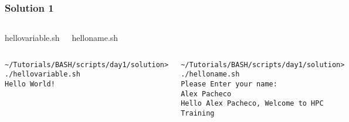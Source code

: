 \documentclass[10pt,t]{beamer}
\begin{document}
\begin{frame}[fragile]
  \frametitle{Solution 1}
  \begin{columns}
    \begin{exampleblock}{hellovariable.sh}
      
    \end{exampleblock}
    \begin{exampleblock}{helloname.sh}
      
    \end{exampleblock}
  \end{columns}
  \begin{columns}
    \begin{exampleblock}{}
      \begin{lstlisting}[basicstyle=\fontsize{4}{4.5}\selectfont\ttfamily]
~/Tutorials/BASH/scripts/day1/solution> ./hellovariable.sh 
Hello World!
      \end{lstlisting}
    \end{exampleblock}
    \begin{exampleblock}{}
      \begin{lstlisting}[basicstyle=\fontsize{4}{4.5}\selectfont\ttfamily]
~/Tutorials/BASH/scripts/day1/solution> ./helloname.sh 
Please Enter your name:
Alex Pacheco
Hello Alex Pacheco, Welcome to HPC Training
      \end{lstlisting}
    \end{exampleblock}
  \end{columns}
\end{frame}
\end{document}
